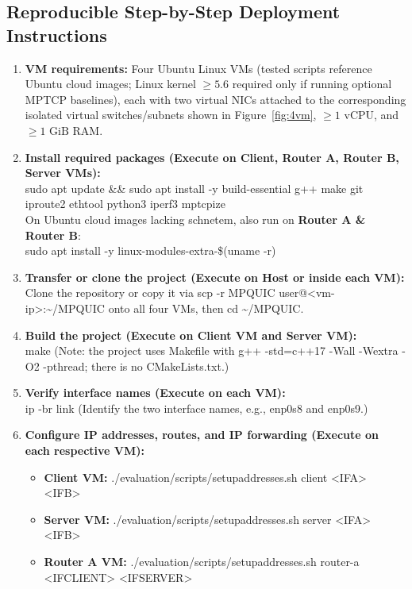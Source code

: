 \documentclass[10pt,a4paper]{article}
\newcommand{\codeul}{\textunderscore\hspace{0pt}}
\DeclareRobustCommand{\code}[1]{{\ttfamily\let\_\codeul #1}}
\begin{document}
\subsection{Reproducible Step-by-Step Deployment Instructions}
\begin{enumerate}
    \item \textbf{VM requirements:} Four Ubuntu Linux VMs (tested scripts reference Ubuntu cloud images; Linux kernel $\ge 5.6$ required only if running optional MPTCP baselines), each with two virtual NICs attached to the corresponding isolated virtual switches/subnets shown in Figure~\ref{fig:4vm}, $\ge 1$ vCPU, and $\ge 1\text{ GiB}$ RAM.
    \item \textbf{Install required packages (Execute on Client, Router A, Router B, Server VMs):}\\
    \code{sudo apt update \&\& sudo apt install -y build-essential g++ make git iproute2 ethtool python3 iperf3 mptcpize}\\
    On Ubuntu cloud images lacking \code{sch\_netem}, also run on \textbf{Router A \& Router B}:\\
    \code{sudo apt install -y linux-modules-extra-\$(uname -r)}
    \item \textbf{Transfer or clone the project (Execute on Host or inside each VM):}\\
    Clone the repository or copy it via \code{scp -r MP\_QUIC user@<vm-ip>:\textasciitilde{}/MP\_QUIC} onto all four VMs, then \code{cd \textasciitilde{}/MP\_QUIC}.
    \item \textbf{Build the project (Execute on Client VM and Server VM):}\\
    \code{make} \quad (Note: the project uses \code{Makefile} with \code{g++ -std=c++17 -Wall -Wextra -O2 -pthread}; there is no \code{CMakeLists.txt}.)
    \item \textbf{Verify interface names (Execute on each VM):}\\
    \code{ip -br link} \quad (Identify the two interface names, e.g., \code{enp0s8} and \code{enp0s9}.)
    \item \textbf{Configure IP addresses, routes, and IP forwarding (Execute on each respective VM):}
    \begin{itemize}
        \item \textbf{Client VM:} \code{./evaluation/scripts/setup\_addresses.sh client <IF\_A> <IF\_B>}
        \item \textbf{Server VM:} \code{./evaluation/scripts/setup\_addresses.sh server <IF\_A> <IF\_B>}
        \item \textbf{Router A VM:} \code{./evaluation/scripts/setup\_addresses.sh router-a <IF\_CLIENT> <IF\_SERVER>}

\end{itemize}
\end{enumerate}
\end{document}

